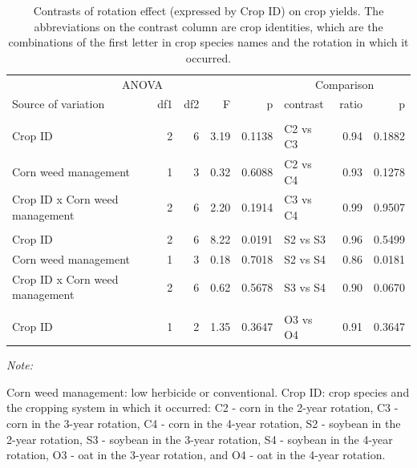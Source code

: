 \documentclass[
]{article}
\begin{document}
\begin{table}

\caption{\label{tab:crop-jt-ct}Contrasts of rotation effect (expressed by Crop ID) on crop yields. The abbreviations on the contrast column are crop identities, which are the combinations of the first letter in crop species names and the rotation in which it occurred.}
\centering
\begin{threeparttable}
\begin{tabular}[t]{lrrr>{}r|lrr}
\toprule
\multicolumn{5}{c}{ANOVA} & \multicolumn{3}{c}{Comparison} \\
\cmidrule(l{3pt}r{3pt}){1-5} \cmidrule(l{3pt}r{3pt}){6-8}
Source of variation & df1 & df2 & F & p & contrast & ratio & p\\
\midrule
\addlinespace[0.3em]
\multicolumn{8}{l}{\textbf{(A) - Corn}}\\
\hspace{1em}Crop ID & 2 & 6 & 3.19 & 0.1138 & C2 vs C3 & 0.94 & 0.1882\\
\hspace{1em}Corn weed management & 1 & 3 & 0.32 & 0.6088 & C2 vs C4 & 0.93 & 0.1278\\
\hspace{1em}Crop ID x Corn weed management & 2 & 6 & 2.20 & 0.1914 & C3 vs C4 & 0.99 & 0.9507\\
\addlinespace[0.3em]
\multicolumn{8}{l}{\textbf{(B) - Soybean}}\\
\hspace{1em}Crop ID & 2 & 6 & 8.22 & 0.0191 & S2 vs S3 & 0.96 & 0.5499\\
\hspace{1em}Corn weed management & 1 & 3 & 0.18 & 0.7018 & S2 vs S4 & 0.86 & 0.0181\\
\hspace{1em}Crop ID x Corn weed management & 2 & 6 & 0.62 & 0.5678 & S3 vs S4 & 0.90 & 0.0670\\
\addlinespace[0.3em]
\multicolumn{8}{l}{\textbf{(C) - Oat}}\\
\hspace{1em}Crop ID & 1 & 2 & 1.35 & 0.3647 & O3 vs O4 & 0.91 & 0.3647\\
\bottomrule
\end{tabular}
\begin{tablenotes}[para]
\item \textit{Note: } 
\item Corn weed management: low herbicide or conventional. Crop ID: crop species and the cropping system in which it occurred: C2 - corn in the 2-year rotation, C3 - corn in the 3-year rotation, C4 - corn in the 4-year rotation, S2 - soybean in the 2-year rotation, S3 - soybean in the 3-year rotation, S4 - soybean in the 4-year rotation, O3 - oat in the 3-year rotation, and O4 - oat in the 4-year rotation.
\end{tablenotes}
\end{threeparttable}
\end{table}
\end{document}
